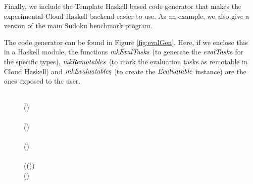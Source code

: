 \documentclass[paper=A4,twoside=true,openright,parskip=full,chapterprefix=true,headings=normal,bibliography=totoc,listof=totoc,titlepage=on,captions=tableabove,draft=false,british]{scrreprt}%
\begin{document}
\label{sec:appendixCloudHaskell}

Finally, we include the Template Haskell based code generator that makes
the experimental Cloud Haskell backend easier to use. As an example, we
also give a version of the main Sudoku benchmark program.

The code generator can be found in Figure \ref{fig:evalGen}. Here, if we
enclose this in a Haskell module, the functions \ensuremath{\Varid{mkEvalTasks}} (to
generate the \ensuremath{\Varid{evalTask}}s for the specific types), \ensuremath{\Varid{mkRemotables}} (to
mark the evaluation tasks as remotable in Cloud Haskell) and
\ensuremath{\Varid{mkEvaluatables}} (to create the \ensuremath{\Conid{Evaluatable}} instance) are the ones
exposed to the user.

\begin{figure}[th]
\centering
\begin{hscode}\SaveRestoreHook
{}%
%
%
%
%
%
\>[B]{}\mathbin{::}\to {}\to {}\<[E]%
\\
\>[B]{}\;\;\mathrel{=}(\;){}\<[E]%
\\[\blanklineskip]%
\>[B]{}\mathbin{::}\to {}\to {}\<[E]%
\\
\>[B]{}\;\;\mathrel{=}(\;)\<[E]%
\\[\blanklineskip]%
\>[B]{}\mathbin{::}\to {}\to {}\<[E]%
\\
\>[B]{}\;\;\mathrel{=}()\<[E]%
\\[\blanklineskip]%
\>[B]{}\mathbin{::}\to {}\<[E]%
\\
\>[B]{}\;(\;(\;)\;\anonymous )\mathrel{=}{}\<[E]%
\\
\>[B]{}\<[5]%
\>[5]{}\mathbin{\$}(\plus {}\plus {}){}\<[E]%

\end{hscode}
\end{figure}
\end{document}
